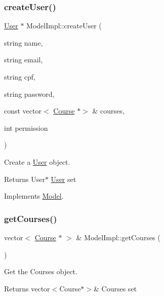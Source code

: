 \subsubsection{\texorpdfstring{create\+User()}{createUser()}}
{\footnotesize\ttfamily \hyperlink{classUser}{User} $\ast$ Model\+Impl\+::create\+User (\begin{DoxyParamCaption}\item[{string}]{name,  }\item[{string}]{email,  }\item[{string}]{cpf,  }\item[{string}]{password,  }\item[{const vector$<$ \hyperlink{classCourse}{Course} $\ast$$>$ \&}]{courses,  }\item[{int}]{permission }\end{DoxyParamCaption})\hspace{0.3cm}{\ttfamily [virtual]}}



Create a \hyperlink{classUser}{User} object. 

\begin{DoxyReturn}{Returns}
User$\ast$ \hyperlink{classUser}{User} set 
\end{DoxyReturn}


Implements \hyperlink{classModel_a8080158d8cd5ff74bb0daae3824c220b}{Model}.

\mbox{\label{classModelImpl_afc84ed40271afee13778f4e9f9f90e2e}} 
\subsubsection{\texorpdfstring{get\+Courses()}{getCourses()}}
{\footnotesize\ttfamily vector$<$ \hyperlink{classCourse}{Course} $\ast$ $>$ \& Model\+Impl\+::get\+Courses (\begin{DoxyParamCaption}{ }\end{DoxyParamCaption})\hspace{0.3cm}{\ttfamily [virtual]}}



Get the Courses object. 

\begin{DoxyReturn}{Returns}
vector$<$\+Course$\ast$$>$\& Courses set 
\end{DoxyReturn}



